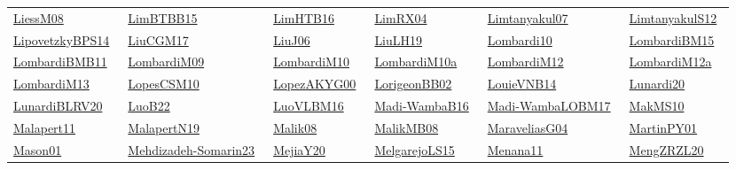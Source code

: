 \begin{longtable}{*{6}{l}}
\href{works/LiessM08.pdf}{LiessM08}~\cite{LiessM08} & \href{works/LimBTBB15.pdf}{LimBTBB15}~\cite{LimBTBB15} & \href{works/LimHTB16.pdf}{LimHTB16}~\cite{LimHTB16} & \href{works/LimRX04.pdf}{LimRX04}~\cite{LimRX04} & \href{works/Limtanyakul07.pdf}{Limtanyakul07}~\cite{Limtanyakul07} & \href{works/LimtanyakulS12.pdf}{LimtanyakulS12}~\cite{LimtanyakulS12}\\ 
\href{works/LipovetzkyBPS14.pdf}{LipovetzkyBPS14}~\cite{LipovetzkyBPS14} & \href{works/LiuCGM17.pdf}{LiuCGM17}~\cite{LiuCGM17} & \href{works/LiuJ06.pdf}{LiuJ06}~\cite{LiuJ06} & \href{works/LiuLH19.pdf}{LiuLH19}~\cite{LiuLH19} & \href{works/Lombardi10.pdf}{Lombardi10}~\cite{Lombardi10} & \href{works/LombardiBM15.pdf}{LombardiBM15}~\cite{LombardiBM15}\\ 
\href{works/LombardiBMB11.pdf}{LombardiBMB11}~\cite{LombardiBMB11} & \href{works/LombardiM09.pdf}{LombardiM09}~\cite{LombardiM09} & \href{works/LombardiM10.pdf}{LombardiM10}~\cite{LombardiM10} & \href{works/LombardiM10a.pdf}{LombardiM10a}~\cite{LombardiM10a} & \href{works/LombardiM12.pdf}{LombardiM12}~\cite{LombardiM12} & \href{works/LombardiM12a.pdf}{LombardiM12a}~\cite{LombardiM12a}\\ 
\href{works/LombardiM13.pdf}{LombardiM13}~\cite{LombardiM13} & \href{works/LopesCSM10.pdf}{LopesCSM10}~\cite{LopesCSM10} & \href{works/LopezAKYG00.pdf}{LopezAKYG00}~\cite{LopezAKYG00} & \href{works/LorigeonBB02.pdf}{LorigeonBB02}~\cite{LorigeonBB02} & \href{works/LouieVNB14.pdf}{LouieVNB14}~\cite{LouieVNB14} & \href{works/Lunardi20.pdf}{Lunardi20}~\cite{Lunardi20}\\ 
\href{works/LunardiBLRV20.pdf}{LunardiBLRV20}~\cite{LunardiBLRV20} & \href{works/LuoB22.pdf}{LuoB22}~\cite{LuoB22} & \href{works/LuoVLBM16.pdf}{LuoVLBM16}~\cite{LuoVLBM16} & \href{works/Madi-WambaB16.pdf}{Madi-WambaB16}~\cite{Madi-WambaB16} & \href{works/Madi-WambaLOBM17.pdf}{Madi-WambaLOBM17}~\cite{Madi-WambaLOBM17} & \href{works/MakMS10.pdf}{MakMS10}~\cite{MakMS10}\\ 
\href{works/Malapert11.pdf}{Malapert11}~\cite{Malapert11} & \href{works/MalapertN19.pdf}{MalapertN19}~\cite{MalapertN19} & \href{works/Malik08.pdf}{Malik08}~\cite{Malik08} & \href{works/MalikMB08.pdf}{MalikMB08}~\cite{MalikMB08} & \href{works/MaraveliasG04.pdf}{MaraveliasG04}~\cite{MaraveliasG04} & \href{works/MartinPY01.pdf}{MartinPY01}~\cite{MartinPY01}\\ 
\href{works/Mason01.pdf}{Mason01}~\cite{Mason01} & \href{works/Mehdizadeh-Somarin23.pdf}{Mehdizadeh-Somarin23}~\cite{Mehdizadeh-Somarin23} & \href{works/MejiaY20.pdf}{MejiaY20}~\cite{MejiaY20} & \href{works/MelgarejoLS15.pdf}{MelgarejoLS15}~\cite{MelgarejoLS15} & \href{works/Menana11.pdf}{Menana11}~\cite{Menana11} & \href{works/MengZRZL20.pdf}{MengZRZL20}~\cite{MengZRZL20}\\ 

\end{longtable}
